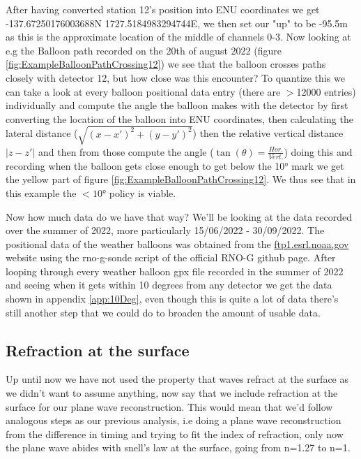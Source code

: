 \documentclass[11pt,a4paper,faculty=we,language=en,doctype=report]{cls/ugent-doc}
\begin{document}
After having converted station 12's position into ENU coordinates we get
-137.67250176003688N 1727.5184983294744E, we then set our "up" to be -95.5m as
this is the approximate location of the middle of channels 0-3.  Now looking at
e.g the Balloon path recorded on the 20th of august 2022 (figure
\ref{fig:ExampleBalloonPathCrossing12}) we see that the balloon crosses paths
closely with detector 12, but how close was this encounter? To quantize this we
can take a look at every balloon positional data entry (there are $>$12000
entries) individually and compute the angle the balloon makes with the detector
by first converting the location of the balloon into ENU coordinates, then
calculating the lateral distance ($\sqrt{(x-x')^2 + (y-y')^2}$) then the
relative vertical distance $|z - z'|$ and then from those compute the angle
($\tan(\theta) = \frac{Hor.}{Vert.}$) doing this and recording when the balloon
gets close enough to get below the 10° mark we get the yellow part of figure
\ref{fig:ExampleBalloonPathCrossing12}. We thus see that in this
example the $<10$° policy is viable.

Now how much data do we have that way? 
We'll be looking at the data recorded over the summer of
2022, more particularly 15/06/2022 - 30/09/2022.
The positional data of the weather balloons was obtained from the
\url{ftp1.esrl.noaa.gov} website using the rno-g-sonde script of the official
RNO-G github page. After looping through every weather
balloon gpx file recorded in the summer of 2022 and seeing when it gets
within 10 degrees from any detector we get the data shown in appendix \ref{app:10Deg}, even
though this is quite a lot of data there's still another step that we could do
to broaden the amount of usable data.
\subsection{Refraction at the surface}
Up until now we have not used the property that waves refract at the surface as
we didn't want to assume anything, now say that we include refraction at the
surface for our plane wave reconstruction. This would mean that we'd follow
analogous steps as our previous analysis, i.e doing a plane wave reconstruction
from the difference in timing and trying to fit the index of refraction, only
now the plane wave abides with snell's law at the surface, going from n=1.27 to
n=1. 
\end{document}
